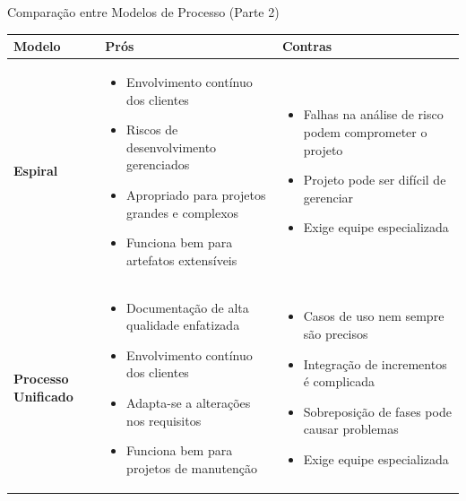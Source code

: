 \documentclass[9pt]{beamer}
\begin{document}
\begin{frame}{Comparação entre Modelos de Processo (Parte 2)}
  \vspace{-0.2cm}
  {\scriptsize
  \begin{tabular}{|p{1.8cm}|p{4cm}|p{4cm}|}
    \hline
    \textbf{Modelo} & \textbf{Prós} & \textbf{Contras} \\
    \hline
    \textbf{Espiral} &
    \begin{itemize}\setlength{\itemsep}{0pt}\setlength{\parskip}{0pt}
      \item Envolvimento contínuo dos clientes
      \item Riscos de desenvolvimento gerenciados
      \item Apropriado para projetos grandes e complexos
      \item Funciona bem para artefatos extensíveis
    \end{itemize} &
    \begin{itemize}\setlength{\itemsep}{0pt}\setlength{\parskip}{0pt}
      \item Falhas na análise de risco podem comprometer o projeto
      \item Projeto pode ser difícil de gerenciar
      \item Exige equipe especializada
    \end{itemize} \\
    \hline
    \textbf{Processo Unificado} &
    \begin{itemize}\setlength{\itemsep}{0pt}\setlength{\parskip}{0pt}
      \item Documentação de alta qualidade enfatizada
      \item Envolvimento contínuo dos clientes
      \item Adapta-se a alterações nos requisitos
      \item Funciona bem para projetos de manutenção
    \end{itemize} &
    \begin{itemize}\setlength{\itemsep}{0pt}\setlength{\parskip}{0pt}
      \item Casos de uso nem sempre são precisos
      \item Integração de incrementos é complicada
      \item Sobreposição de fases pode causar problemas
      \item Exige equipe especializada
    \end{itemize} \\
    \hline
  \end{tabular}
  }
\end{frame}
\end{document}
